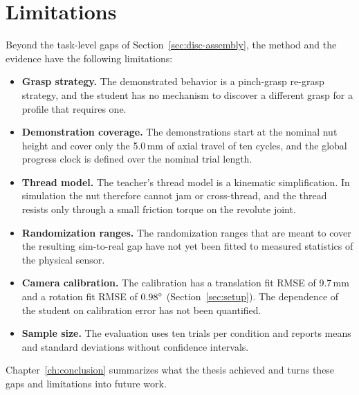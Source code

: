 \section{Limitations}\label{sec:disc-limitations}

Beyond the task-level gaps of Section~\ref{sec:disc-assembly}, the method and the evidence have the following limitations:
\begin{itemize}
  \item \textbf{Grasp strategy.} The demonstrated behavior is a pinch-grasp re-grasp strategy, and the student has no mechanism to discover a different grasp for a profile that requires one.
  \item \textbf{Demonstration coverage.} The demonstrations start at the nominal nut height and cover only the 5.0\,mm of axial travel of ten cycles, and the global progress clock is defined over the nominal trial length.
  \item \textbf{Thread model.} The teacher's thread model is a kinematic simplification. In simulation the nut therefore cannot jam or cross-thread, and the thread resists only through a small friction torque on the revolute joint.
  \item \textbf{Randomization ranges.} The randomization ranges that are meant to cover the resulting sim-to-real gap have not yet been fitted to measured statistics of the physical sensor.
  \item \textbf{Camera calibration.} The calibration has a translation fit \acs{RMSE} of 9.7\,mm and a rotation fit \acs{RMSE} of $0.98^\circ$ (Section~\ref{sec:setup}). The dependence of the student on calibration error has not been quantified.
  \item \textbf{Sample size.} The evaluation uses ten trials per condition and reports means and standard deviations without confidence intervals.
\end{itemize}
Chapter~\ref{ch:conclusion} summarizes what the thesis achieved and turns these gaps and limitations into future work.
